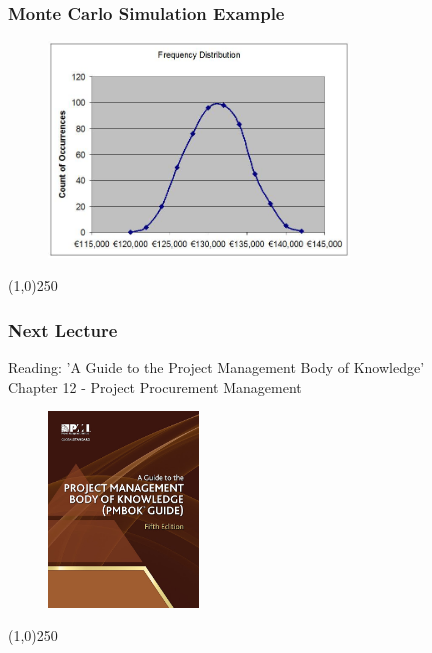 \begin{frame}
\frametitle{Monte Carlo Simulation Example}
\begin{figure}[h]
	\centering
		\includegraphics[width = 8cm]{images/montesample2.jpg}
	\label{fig:montesample2}
\end{figure}

\end{frame}\begin{center}\line(1,0){250}\end{center}

\begin{frame}
\frametitle{Next Lecture}{Reading:}
'A Guide to the Project Management Body of Knowledge'\\ 
Chapter 12 - Project Procurement Management
\begin{figure}[h]
	\centering
		\includegraphics[width = 4cm]{images/book.jpg}
\end{figure}
\end{frame}\begin{center}\line(1,0){250}\end{center}



 
